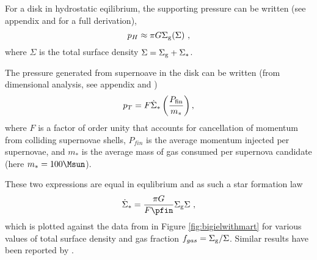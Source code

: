 For a disk in hydrostatic eqilibrium, the supporting pressure can be written (see appendix and \citet{ostriker2011} for a full derivation),
\begin{equation}
\label{eqn:hydeq}
p_H \approx \pi G \Sigma_\mathrm{g} (\Sigma)~,
\end{equation}
where $\Sigma$ is the total surface density $\Sigma = \Sigma_\mathrm{g} + \Sigma_*$.

The pressure generated from supernoave in the disk can be written (from dimensional analysis, see appendix and \citet{martizzi2015})
\begin{equation}
\label{eqn:turb}
p_T = F \dot{\Sigma}_* \left(\frac{P_\mathrm{fin}}{m_*}\right),
\end{equation}
where $F$ is a factor of order unity that accounts for cancellation of momentum from colliding supernovae shells, $P_{fin}$ is the average momentum injected per supernovae, and $m_*$ is the average mass of gas consumed per supernova candidate (here $m_* = 100 \Msun$).

These two expressions are equal in equlibrium and as such a star formation law
\begin{equation}
\label{eqn:martsfr}
\sfr = \frac{\pi G}{F \pfin} \sg \Sigma~,
\end{equation}
which is plotted against the data from \citet{bigiel2008} in Figure \ref{fig:bigielwithmart} for various values of total surface density and gas fraction $f_{gas} = \Sigma_\mathrm{g}/\Sigma$.
Similar results have been reported by \citep{ostriker2011}.
